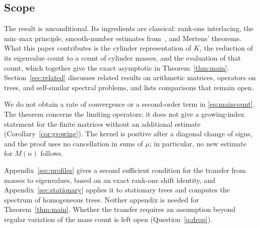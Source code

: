\subsection{Scope}
The result is unconditional. Its ingredients are classical: rank-one
interlacing, the min--max principle, smooth-number estimates
from~\cite{HT}, and Mertens' theorems. What this paper contributes is the
cylinder representation of $K$, the reduction of its eigenvalue count to a
count of cylinder masses, and the evaluation of that count, which together
give the exact asymptotic in Theorem~\ref{thm:main}. Section~\ref{sec:related}
discusses related results on arithmetic matrices, operators on trees, and
self-similar spectral problems, and lists comparisons that remain open.

We do not obtain a rate of convergence or a second-order term in
\eqref{eq:maincount}. The theorem concerns the limiting operators; it
does not give a growing-index statement for the finite matrices without
an additional estimate (Corollary~\ref{cor:growing}). The kernel is
positive after a diagonal change of signs, and the proof uses no
cancellation in sums of $\mu$; in particular, no new estimate for $M(n)$
follows.

Appendix~\ref{sec:profiles} gives a second sufficient condition for the
transfer from masses to eigenvalues, based on an exact rank-one shift
identity, and Appendix~\ref{sec:stationary} applies it to stationary
trees and computes the spectrum of homogeneous trees. Neither appendix is
needed for Theorem~\ref{thm:main}. Whether the transfer requires an
assumption beyond regular variation of the mass count is left open
(Question~\ref{q:drop}).
